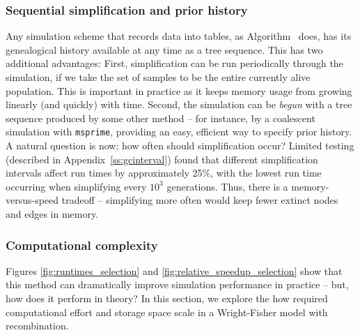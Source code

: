 \documentclass{article}
\newcommand{\msprime}{\texttt{msprime}}
\newcommand{\krt}[1]{{\em \color{green} #1}}
\begin{document}
\subsubsection*{Sequential simplification and prior history}
\label{ss:seq_simp}

Any simulation scheme that records data into tables,
as Algorithm~ does,
has its genealogical history available at any time as a tree sequence.
This has two additional advantages:
First, simplification can be run periodically through the simulation,
if we take the set of samples to be the entire currently alive population.
This is important in practice as it keeps memory usage from growing linearly (and quickly) with time.
Second, the simulation can
be \emph{begun} with a tree sequence produced by some other method -- for
instance, by a coalescent simulation with \msprime,
providing an easy, efficient way to specify prior history.
A natural question is now: how often should simplification occur?
Limited testing (described in Appendix~\ref{ss:gcinterval})
found that different simplification intervals affect run times by approximately
25\%, with the lowest run time occurring when simplifying every $10^3$ generations.
Thus, there is a memory-versus-speed tradeoff
-- simplifying more often would keep fewer extinct nodes and edges in memory.

%



\subsubsection*{Computational complexity}

Figures \ref{fig:runtimes_selection} and \ref{fig:relative_speedup_selection} show that this method
can dramatically improve simulation performance in practice --
but, how does it perform in theory?
In this section, we explore the how required computational effort and storage space scale
in a Wright-Fisher model with recombination.
\end{document}
